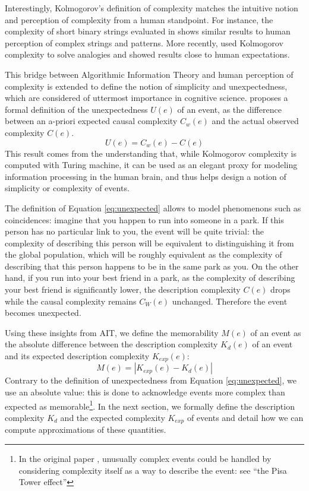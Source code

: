 \documentclass[conference]{IEEEtran}
\begin{document}
Interestingly, Kolmogorov's definition of complexity matches the intuitive
notion and perception of complexity from a human standpoint. For instance, the
complexity of short binary strings evaluated in \cite{delahaye_numerical_2012}
shows similar results to human perception of complex strings and patterns. More
recently, \cite{murena_solving_2020} used Kolmogorov complexity to solve
analogies and showed results close to human expectations.

This bridge between Algorithmic Information Theory and human perception of
complexity is extended to define the notion of simplicity and unexpectedness,
which are considered of uttermost importance in cognitive science\cite
{chater_simplicity_2003}.
\cite{dessalles2011coincidences} proposes a formal definition of the
unexpectedness $U(e)$ of an event, as the difference between an a-priori
expected causal complexity $C_{w}(e)$ and the actual observed complexity $C
  (e)$.
\begin{equation}
  \label{eq:unexpected} U(e) = C_{w}(e) - C(e)
\end{equation}
This result comes from the understanding that, while Kolmogorov complexity is
computed with Turing machine, it can be used as an elegant proxy for modeling
information processing in the human brain, and thus helps design a notion of
simplicity or complexity of events.

The definition of Equation \ref{eq:unexpected} allows to model phenomenons
such as coincidences: imagine that you happen to run into someone in a park.
If this person has no particular link to you, the event will be quite
trivial: the complexity of describing this person will be equivalent to
distinguishing it from the global population, which will be roughly
equivalent as the complexity of describing that this person happens to be in
the same park as you. On the other hand, if you run into your best friend in
a park, as the complexity of describing your best friend is significantly
lower, the description complexity $C(e)$ drops while the causal complexity
remains $C_W (e)$ unchanged. Therefore the event becomes unexpected.

Using these insights from AIT, we define the memorability $M(e)$ of an event as the absolute difference between the description complexity $K_d(e)$ of an event and its expected description complexity $K_{exp}(e)$:
\begin{equation}
  \label{eq:memorability}
  M(e) = |K_{exp}(e) - K_d(e)|
\end{equation}
Contrary to the definition of unexpectedness from Equation \ref{eq:unexpected}, we use an absolute value: this is done to acknowledge events more complex than expected as memorable\footnote{In the original paper \cite{dessalles2011coincidences}, unusually complex events could be handled by considering complexity itself as a way to describe the event: see ``the Pisa Tower effect''\cite{dessalles_pisa_nodate}}. In the next section, we formally define the description complexity $K_d$ and the expected complexity $K_{exp}$ of events and detail how we can compute approximations of these quantities.
\end{document}
